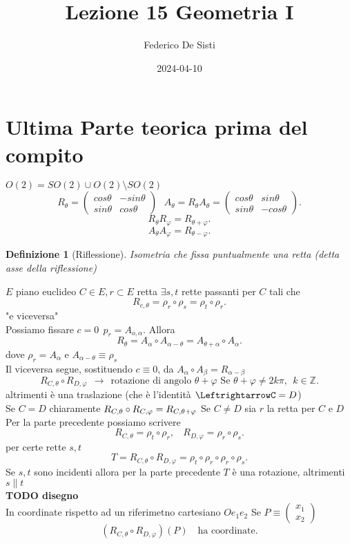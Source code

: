 \documentclass[12px]{article}
\title{Lezione 15 Geometria I}
\date{2024-04-10}
\author{Federico De Sisti}
\theoremstyle{break}
\theoremstyle{break}
\theoremstyle{break}
\theoremstyle{break}
\newtheorem{defin}{Definizione}
\theoremstyle{break}
\theoremstyle{break}
\theoremstyle{break}
\newenvironment{defi}
{\begin{mdframed}[linecolor=orange, backgroundcolor=orange!10]\begin{defin}}
  {\end{defin}\end{mdframed}}
\newcommand{\icol}[1]{%
  \left(\begin{smallmatrix}#1\end{smallmatrix}\right)%
}
\newcommand{\matrice}[1]{%
  \begin{pmatrix}#1\end{pmatrix}%
}
\begin{document}
	\maketitle
	\newpage
	\section{Ultima Parte teorica prima del compito}
	$O(2) = SO(2) \cup O(2)\setminus SO(2)$
	\[
		R_\theta = \matrice{cos\theta & -sin\theta\\ sin\theta& cos\theta}\ \ \ A_\theta = R_\theta A_\theta = \matrice{cos\theta& sin\theta\\ sin\theta & -cos\theta}
	.\] 
	\[
		R_\theta R_\varphi = R_{\theta + \varphi}
	.\] 
	\[
		A_\theta A_ \varphi = R_{\theta - \varphi}
	.\] 
	\begin{defi}[Riflessione]
		Isometria che fissa puntualmente una retta (detta asse della riflessione)
	\end{defi}
	$E$ piano euclideo
	$C\in E, r\subset E$ retta $\exists s,t$ rette passanti per $C$ tali che
	\[
	 R_{c,\theta} = \rho_r \circ\rho_s = \rho_t\circ\rho_r	.\] 
	"e viceversa"\\
	Possiamo fissare $c = 0 \ \ p_r = A_{o,\alpha}.$ Allora
	\[
		R_\theta = A_\alpha\circ A_{\alpha - \theta} = A_{\theta + \alpha}\circ A_\alpha
	.\] 
	dove $\rho_r = A_\alpha$ e $A_{\alpha - \theta} \equiv \rho_s$
\\
Il viceversa segue, sostituendo $c\equiv 0$, da $A_\alpha\circ A_\beta = R_{\alpha - \beta}$
 \[
	 R_{C,\theta}\circ R_{D,\varphi} \ \ \rightarrow \ \ \text{rotazione di angolo } \theta + \varphi \text{ Se } \theta + \varphi\neq 2k\pi,\ \ k\in \mathbb{Z}
.\] 
altrimenti è una traslazione (che è l'identità $ \LeftrightarrowC = D$)\\
Se $C = D$ chiaramente $R_{C,\theta}\circ R_{C, \varphi} = R_{C,\theta + \varphi}\\$
Se $C \neq D$ sia $r$ la retta per $C$ e $D$ Per la parte precedente possiamo scrivere
\[
	R_{C,\theta} = \rho_t\circ\rho_r, \ \ \ \ R_{D,\varphi} = \rho_r\circ\rho_s
.\] 
per certe rette $s,t$ 
\[
	T = R_{C,\theta}\circ R_{D,\varphi} = \rho_t\circ\rho_r\circ\rho_r\circ\rho_s
.\] 
Se $s,t$ sono incidenti allora per la parte precedente $T$ è una rotazione, altrimenti $s\parallel t$\\
\textbf{TODO disegno}\\
In coordinate rispetto ad un riferimetno cartesiano $Oe_1e_2$ Se $P\equiv\icol{x_1\\x_2}$ 
\[
	(R_{C,\theta}\circ R_{D,\varphi})(P) \ \ \ \text{ ha coordinate}
.\] 
\end{document}
